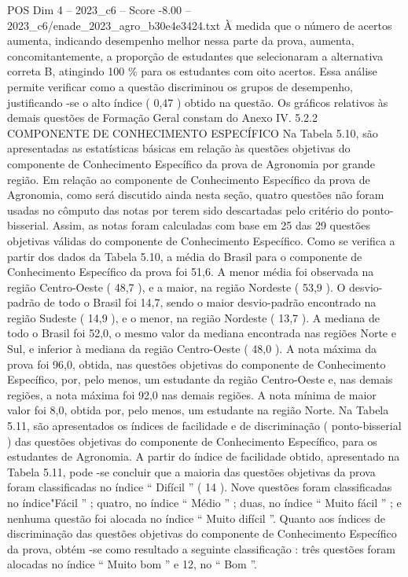 \begin{textsample}{POS Dim 4 – 2023\_c6 – Score -8.00 – 2023\_c6/enade\_2023\_agro\_b30e4e3424.txt}
À medida que o número de acertos aumenta, indicando desempenho melhor nessa parte da prova, aumenta, concomitantemente, a proporção de estudantes que selecionaram a alternativa correta B, atingindo 100 \% para os estudantes com oito acertos.
Essa análise permite verificar como a questão discriminou os grupos de desempenho, justificando -se o alto índice ( 0,47 ) obtido na questão.
Os gráficos relativos às demais questões de Formação Geral constam do Anexo IV. 5.2.2 COMPONENTE DE CONHECIMENTO ESPECÍFICO Na Tabela 5.10, são apresentadas as estatísticas básicas em relação às questões objetivas do componente de Conhecimento Específico da prova de Agronomia por grande região.
Em relação ao componente de Conhecimento Específico da prova de Agronomia, como será discutido ainda nesta seção, quatro questões não foram usadas no cômputo das notas por terem sido descartadas pelo critério do ponto-bisserial.
Assim, as notas foram calculadas com base em 25 das 29 questões objetivas válidas do componente de Conhecimento Específico.
Como se verifica a partir dos dados da Tabela 5.10, a média do Brasil para o componente de Conhecimento Específico da prova foi 51,6.
A menor média foi observada na região Centro-Oeste ( 48,7 ), e a maior, na região Nordeste ( 53,9 ).
O desvio-padrão de todo o Brasil foi 14,7, sendo o maior desvio-padrão encontrado na região Sudeste ( 14,9 ), e o menor, na região Nordeste ( 13,7 ).
A mediana de todo o Brasil foi 52,0, o mesmo valor da mediana encontrada nas regiões Norte e Sul, e inferior à mediana da região Centro-Oeste ( 48,0 ).
A nota máxima da prova foi 96,0, obtida, nas questões objetivas do componente de Conhecimento Específico, por, pelo menos, um estudante da região Centro-Oeste e, nas demais regiões, a nota máxima foi 92,0 nas demais regiões.
A nota mínima de maior valor foi 8,0, obtida por, pelo menos, um estudante na região Norte.
Na Tabela 5.11, são apresentados os índices de facilidade e de discriminação ( ponto-bisserial ) das questões objetivas do componente de Conhecimento Específico, para os estudantes de Agronomia.
A partir do índice de facilidade obtido, apresentado na Tabela 5.11, pode -se concluir que a maioria das questões objetivas da prova foram classificadas no índice “ Difícil ” ( 14 ).
Nove questões foram classificadas no índice"Fácil ” ; quatro, no índice “ Médio ” ; duas, no índice “ Muito fácil ” ; e nenhuma questão foi alocada no índice “ Muito difícil ”.
Quanto aos índices de discriminação das questões objetivas do componente de Conhecimento Específico da prova, obtém -se como resultado a seguinte classificação : três questões foram alocadas no índice “ Muito bom ” e 12, no “ Bom ”.

\end{textsample}
